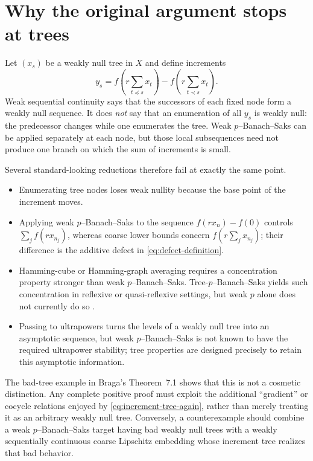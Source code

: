 \documentclass[11pt]{amsart}
\theoremstyle{definition}
\theoremstyle{remark}
\begin{document}
\section{Why the original argument stops at trees}

Let $(x_s)$ be a weakly null tree in $X$ and define increments
\begin{equation}\label{eq:increment-tree-again}
 y_s=f\!\left(r\sum_{t\preceq s}x_t\right)
      -f\!\left(r\sum_{t\prec s}x_t\right).
\end{equation}
Weak sequential continuity says that the successors of each fixed node form a weakly null sequence.  It does \emph{not} say that an enumeration of all $y_s$ is weakly null: the predecessor changes while one enumerates the tree.  Weak $p$--Banach--Saks can be applied separately at each node, but those local subsequences need not produce one branch on which the sum of increments is small.

Several standard-looking reductions therefore fail at exactly the same point.
\begin{itemize}
 \item Enumerating tree nodes loses weak nullity because the base point of the increment moves.
 \item Applying weak $p$--Banach--Saks to the sequence $f(rx_n)-f(0)$ controls $\sum_j f(rx_{n_j})$, whereas coarse lower bounds concern $f(r\sum_jx_{n_j})$; their difference is the additive defect in \eqref{eq:defect-definition}.
 \item Hamming-cube or Hamming-graph averaging requires a concentration property stronger than weak $p$--Banach--Saks.  Tree-$p$--Banach--Saks yields such concentration in reflexive or quasi-reflexive settings, but weak $p$ alone does not currently do so \cite{FovelleHamming}.
 \item Passing to ultrapowers turns the levels of a weakly null tree into an asymptotic sequence, but weak $p$--Banach--Saks is not known to have the required ultrapower stability; tree properties are designed precisely to retain this asymptotic information.
\end{itemize}

The bad-tree example in Braga's Theorem~7.1 shows that this is not a cosmetic distinction.  Any complete positive proof must exploit the additional ``gradient'' or cocycle relations enjoyed by \eqref{eq:increment-tree-again}, rather than merely treating it as an arbitrary weakly null tree.  Conversely, a counterexample should combine a weak $p$--Banach--Saks target having bad weakly null trees with a weakly sequentially continuous coarse Lipschitz embedding whose increment tree realizes that bad behavior.
\end{document}
